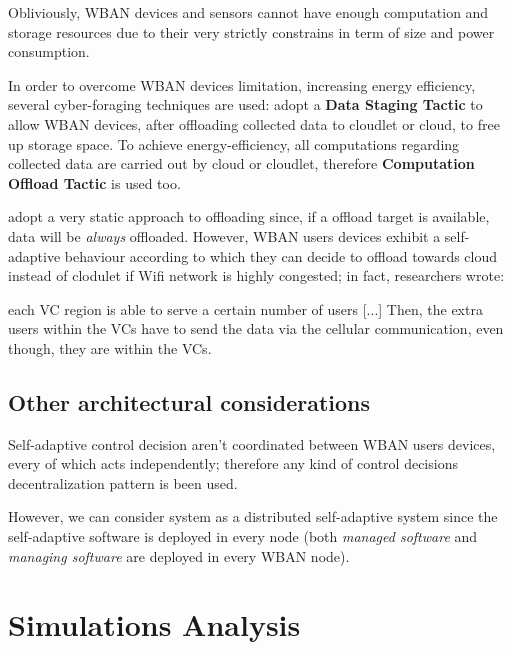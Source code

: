 \documentclass[sigchi]{acmart}
\begin{document}
\vspace{0.3cm}

Obliviously, WBAN devices and sensors cannot have enough computation and storage resources due to their very strictly constrains in term of size and power consumption. 

In order to overcome WBAN devices limitation, increasing energy efficiency, several cyber-foraging techniques are used: \citet{MSAReport} adopt a \textbf{Data Staging Tactic} to allow WBAN devices, after oﬄoading collected data to cloudlet or cloud, to free up storage space. To achieve energy-efficiency, all computations regarding collected data are carried out by cloud or cloudlet, therefore \textbf{Computation Offload Tactic} is used too.

\citet{MSAReport} adopt a very static approach to offloading since, if a offload target is available, data will be \textit{always} offloaded. 
However, WBAN users devices exhibit a self-adaptive behaviour according to which they can decide to offload towards cloud instead of clodulet if Wifi network is highly congested; in fact, researchers wrote:

\vspace{0.3cm}

\begin{quoting}[font=itshape, begintext={``}, endtext={''\cite[par.~5.1]{MSAReport}}]
each VC region is able to serve a certain number of users [...] Then, the extra users within the VCs have to send the data via the cellular communication, even though, they are within the VCs. 
\end{quoting}

\vspace{0.3cm}

\subsection{Other architectural considerations}

Self-adaptive control decision aren't coordinated between WBAN users devices, every of which acts independently; therefore any kind of control decisions decentralization pattern is been used.

However, we can consider \citet{MSAReport} system as a distributed self-adaptive system since the self-adaptive software is deployed in every node (both \textit{managed software} and \textit{managing software} are deployed in every WBAN node).

\section{Simulations Analysis}
\end{document}
